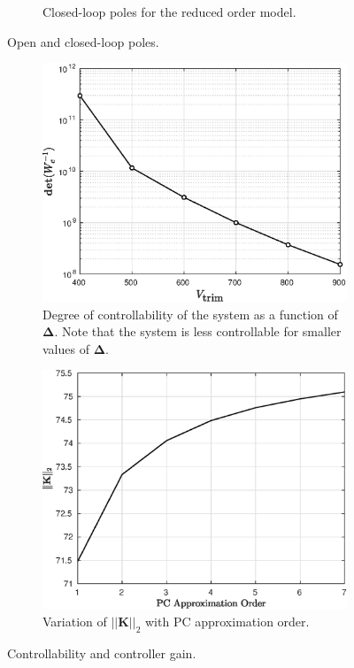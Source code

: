 \documentclass[letterpaper, 10 pt, conference]{ieeeconf}  %
\newcommand{\vo}[1]{\boldsymbol{#1}}
\newcommand{\Del}{\vo{\Delta}}
\begin{document}
\begin{figure}[!ht]
\begin{subfigure}[t]{0.23\textwidth}
   \caption{Closed-loop poles for the reduced order model.}
   \label{clLoopPoles}
   \end{subfigure}
   \caption{Open and closed-loop poles.}
\end{figure}
\vspace{100mm}
\begin{figure}[!ht]
\begin{subfigure}[t]{0.23\textwidth}
   \includegraphics[width=\textwidth]{figs/ctrbEnergy.eps}
   \caption{Degree of controllability of the system as a function of $\Del$. Note that the system is less controllable for smaller values of $\Del$.}
   \label{ctrbEnergy}
	\end{subfigure}\hfill
   \begin{subfigure}[t]{0.23\textwidth}
   \includegraphics[width=\textwidth]{figs/kGain.eps}
   \caption{Variation of $||\vo{K}||_2$ with PC approximation order.}
   \label{kGain}
   \end{subfigure}
   \caption{Controllability and controller gain.}
\end{figure}
\end{document}
